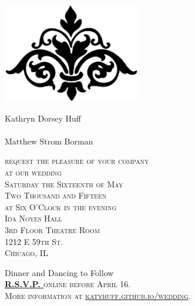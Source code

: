 \documentclass{letter}[12pt]
\newcommand*\initfamily{\usefont{U}{Typocaps}{xl}{n}}
\begin{document}
\begin{letter}{}
   \begin{center}
     \includegraphics[width=6cm]{flourish.eps}

     \vspace{5mm}

\normalfont\calligra
\Large
{\selectfont\Huge K}athryn
{\selectfont\Huge D}orsey
{\selectfont\Huge H}uff\\
{\selectfont{and}}\\
{\selectfont\Huge M}atthew 
{\selectfont\Huge S}trom
{\selectfont\Huge B}orman

     \vspace{5mm}

{\normalfont\scshape\normalsize
     request the pleasure of your company\\
     at our wedding\\
     Saturday the Sixteenth of May\\
     Two Thousand and Fifteen\\
     at Six O'Clock in the evening\\
     Ida Noyes Hall\\
     3rd Floor Theatre Room\\
     1212 E 59th St.\\
     Chicago, IL

     \vspace{2mm}
}
     {\selectfont Dinner and Dancing to Follow}\\
     \vspace{2mm}
     {\normalfont\scshape\normalsize \textbf{\href{http://bit.ly/skwed}{R.S.V.P. }}online before April 16.\\
     More information at \href{http://katyhuff.github.io/wedding}{katyhuff.github.io/wedding}.}

     \vspace{5mm}
    
   \end{center}

       \end{letter}
       
\end{document}
